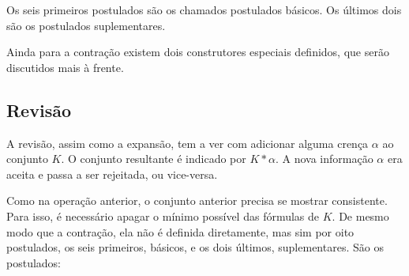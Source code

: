 Os seis primeiros postulados são os chamados postulados básicos. Os últimos dois são os postulados suplementares.

Ainda para a contração existem dois construtores especiais definidos, que serão discutidos mais à frente.

\subsection{Revisão}

A revisão, assim como a expansão, tem a ver com adicionar alguma crença $ \alpha $ ao conjunto $ K $. O conjunto resultante é indicado por $ K \ast \alpha $. A nova informação $ \alpha $ era aceita e passa a ser rejeitada, ou vice-versa.

Como na operação anterior, o conjunto anterior precisa se mostrar consistente. Para isso, é necessário apagar o mínimo possível das fórmulas de $ K $. De mesmo modo que a contração, ela não é definida diretamente, mas sim por oito postulados, os seis primeiros, básicos, e os dois últimos, suplementares. São os postulados:


